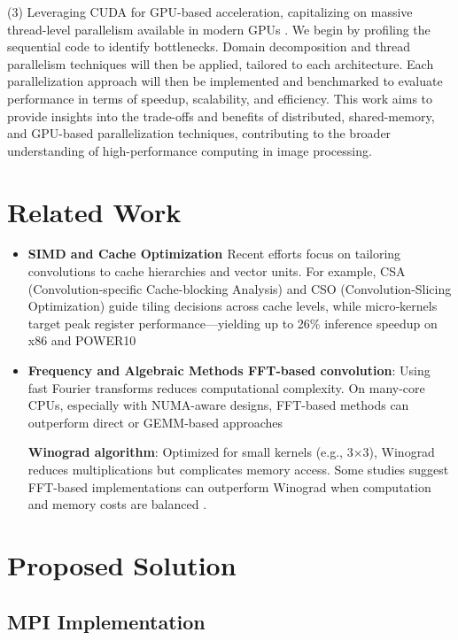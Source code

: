\documentclass[conference, 10pt]{IEEEtran}
\begin{document}
(3) Leveraging CUDA for GPU-based acceleration,
capitalizing on massive thread-level parallelism available in modern GPUs \cite{nvidia2021cuda}.
We begin by profiling the sequential code to identify bottlenecks. 
Domain decomposition and thread parallelism techniques will then be applied, tailored to each architecture. 
Each parallelization approach will then be implemented and benchmarked 
to evaluate performance in terms of speedup, scalability, and efficiency.
This work aims to provide insights into the trade-offs and benefits of distributed, shared-memory, and GPU-based parallelization techniques, 
contributing to the broader understanding of high-performance computing in image processing.


\section{Related Work}
\begin{itemize}
    \item \textbf{SIMD and Cache Optimization \cite{Ferrari2023}}
    Recent efforts focus on tailoring convolutions to cache hierarchies and vector units. For example, CSA (Convolution‑specific Cache-blocking Analysis) and CSO (Convolution‑Slicing Optimization) guide tiling decisions across cache levels, while micro‑kernels target peak register performance—yielding up to 26\% inference speedup on x86 and POWER10
    
    \item \textbf{Frequency and Algebraic Methods \cite{Huang2021}}
    \textbf{FFT-based convolution}: Using fast Fourier transforms reduces computational complexity. On many-core CPUs, especially with NUMA-aware designs, FFT-based methods can outperform direct or GEMM‑based approaches
    
    \textbf{Winograd algorithm}: Optimized for small kernels (e.g., 3×3), Winograd reduces multiplications but complicates memory access. Some studies suggest FFT-based implementations can outperform Winograd when computation and memory costs are balanced .
\end{itemize}




\section{Proposed Solution}

\subsection{MPI Implementation}
\end{document}
